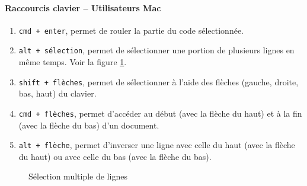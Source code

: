 \documentclass[10.5pt,a4paper]{article}
\begin{document}
      \paragraph{Raccourcis clavier -- Utilisateurs Mac}
      \begin{enumerate}
        \item \texttt{cmd + enter}, permet de rouler la partie du code sélectionnée.
        \item \texttt{alt + sélection}, permet de sélectionner une portion de plusieurs lignes en même temps. Voir la figure \ref{altSelect}.
        \item \texttt{shift + flèches}, permet de sélectionner à l'aide des flèches (gauche, droite, bas, haut) du clavier.
        \item \texttt{cmd + flèches}, permet d'accéder au début (avec la flèche du haut) et à la fin (avec la flèche du bas) d'un document.
        \item \texttt{alt + flèche}, permet d'inverser une ligne avec celle du haut (avec la flèche du haut) ou avec celle du bas (avec la flèche du bas).
      \end{enumerate}
      
      \begin{figure}[H]
      \centering
      \caption{Sélection multiple de lignes}
      \label{altSelect}
      \end{figure}
      
\end{document}
